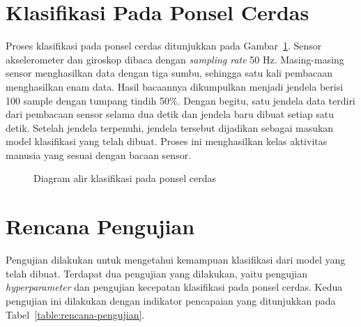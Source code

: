 \section{Klasifikasi Pada Ponsel Cerdas}
Proses klasifikasi pada ponsel cerdas ditunjukkan pada Gambar~\ref{gambar:diagram-alir-klasifikasi-ponsel-cerdas}. Sensor akselerometer dan giroskop dibaca dengan \textit{sampling rate} 50 Hz. Masing-masing sensor menghasilkan data dengan tiga sumbu, sehingga satu kali pembacaan menghasilkan enam data. Hasil bacaannya dikumpulkan menjadi jendela berisi 100 sample dengan tumpang tindih 50\%. Dengan begitu, satu jendela data terdiri dari pembacaan sensor selama dua detik dan jendela baru dibuat setiap satu detik. Setelah jendela terpenuhi, jendela tersebut dijadikan sebagai masukan model klasifikasi yang telah dibuat. Proses ini menghasilkan kelas aktivitas manusia yang sesuai dengan bacaan sensor.

\begin{figure}[h]
    \centering
    \caption{Diagram alir klasifikasi pada ponsel cerdas}
    \label{gambar:diagram-alir-klasifikasi-ponsel-cerdas}
\end{figure}

%
\section{Rencana Pengujian}
Pengujian dilakukan untuk mengetahui kemampuan klasifikasi dari model yang telah dibuat. Terdapat dua pengujian yang dilakukan, yaitu pengujian \textit{hyperparameter} dan pengujian kecepatan klasifikasi pada ponsel cerdas. Kedua pengujian ini dilakukan dengan indikator pencapaian yang ditunjukkan pada Tabel~\ref{table:rencana-pengujian}.

